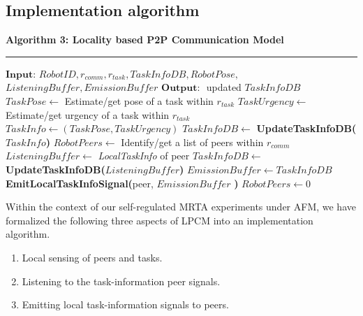 \documentclass[final,5p,times,twocolumn]{elsarticle}
\newcommand{\HRule}{\rule{\linewidth}{0.3mm}}
\begin{document}
\subsection{Implementation algorithm}
\textbf{\small Algorithm 3: Locality based P2P Communication Model}
\vspace{-3mm}
\newline
\HRule
\begin{algorithmic}[1]
\label{alg:lpcm}
\State $\textbf{Input: } RobotID, r_{comm}, r_{task}, TaskInfoDB, RobotPose,$\\ \hspace*{1cm}$ListeningBuffer, EmissionBuffer$
\State $\textbf{Output: }$ updated $TaskInfoDB$
\State {}
\State $ TaskPose \gets $ Estimate/get pose of a task within $r_{task}$
\State $ TaskUrgency \gets $ Estimate/get urgency of a task within $r_{task}$
\State $ TaskInfo \gets (TaskPose, TaskUrgency) $ 
\State $TaskInfoDB \gets$
\newline
\textbf{UpdateTaskInfoDB(}$TaskInfo$\textbf{)}
\State {}
\State $ RobotPeers \gets $ Identify/get a list of peers within $r_{comm}$
\State $ListeningBuffer \gets $ \textit{\textit{LocalTaskInfo}} of peer
\State $TaskInfoDB \gets$
\newline 
\textbf{UpdateTaskInfoDB(}$ListeningBuffer$\textbf{)}
\EndIf
\EndFor
\State {}
\State $ EmissionBuffer \gets TaskInfoDB$
\State \textbf{EmitLocalTaskInfoSignal(}peer, $EmissionBuffer$ \textbf{) }
\EndFor
\State $RobotPeers \gets 0$
\end{algorithmic}
Within the context of our self-regulated MRTA experiments under AFM,  we have formalized the following three aspects of LPCM into an implementation algorithm. 
\begin{enumerate}
\item Local sensing of peers and tasks.
\item Listening to the task-information peer signals.
\item Emitting local task-information signals to peers.
\end{enumerate}
\end{document}
